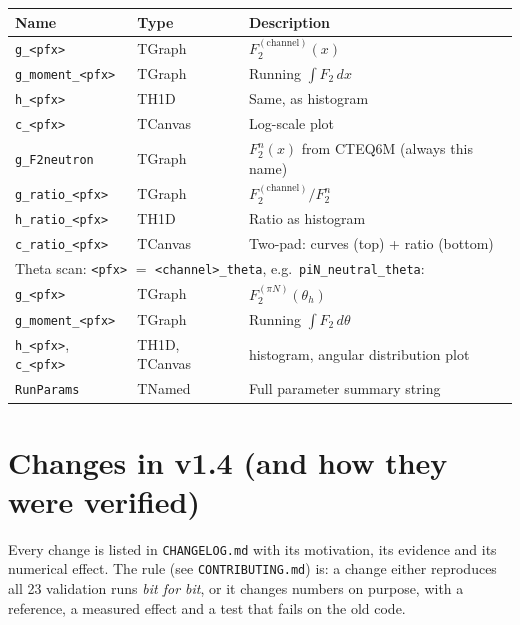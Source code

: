 \documentclass[11pt,a4paper]{article}
\begin{document}
\begin{center}
\begin{tabular}{lll}
\toprule
\textbf{Name} & \textbf{Type} & \textbf{Description} \\
\midrule
\texttt{g\_<pfx>}             & TGraph  & $F_2^{(\text{channel})}(x)$ \\
\texttt{g\_moment\_<pfx>}     & TGraph  & Running $\int F_2\,dx$ \\
\texttt{h\_<pfx>}             & TH1D    & Same, as histogram \\
\texttt{c\_<pfx>}             & TCanvas & Log-scale plot \\
\texttt{g\_F2neutron}         & TGraph  & $F_2^n(x)$ from CTEQ6M (always this name) \\
\texttt{g\_ratio\_<pfx>}      & TGraph  & $F_2^{(\text{channel})} / F_2^n$ \\
\texttt{h\_ratio\_<pfx>}      & TH1D    & Ratio as histogram \\
\texttt{c\_ratio\_<pfx>}      & TCanvas & Two-pad: curves (top) + ratio (bottom) \\
\multicolumn{3}{l}{\small Theta scan: \texttt{<pfx>} $=$ \texttt{<channel>\_theta}, e.g.\ \texttt{piN\_neutral\_theta}:} \\
\texttt{g\_<pfx>}             & TGraph  & $F_2^{(\pi N)}(\theta_h)$ \\
\texttt{g\_moment\_<pfx>}     & TGraph  & Running $\int F_2\,d\theta$ \\
\texttt{h\_<pfx>}, \texttt{c\_<pfx>} & TH1D, TCanvas & histogram, angular distribution plot \\
\texttt{RunParams}            & TNamed  & Full parameter summary string \\
\bottomrule
\end{tabular}
\end{center}

\section{Changes in v1.4 (and how they were verified)}
\label{sec:v14}

Every change is listed in \texttt{CHANGELOG.md} with its motivation, its
evidence and its numerical effect.  The rule (see \texttt{CONTRIBUTING.md})
is: a change either reproduces all 23 validation runs \emph{bit for bit},
or it changes numbers on purpose, with a reference, a measured effect and a
test that fails on the old code.
\end{document}
